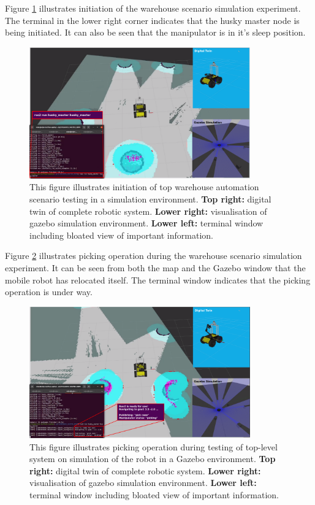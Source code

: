 Figure \ref{fig:R:WA:simTopLevel0} illustrates initiation of the warehouse scenario simulation experiment. The terminal in the lower right corner indicates that the husky master node is being initiated. It can also be seen that the manipulator is in it's sleep position.

\begin{figure}[htp!]
  \centering
  \includegraphics[width = 0.85\textwidth]{Figures/figSimTopLevel0.pdf}
  \caption{This figure illustrates initiation of top warehouse automation scenario testing in a simulation environment. \textbf{Top right:} digital twin of complete robotic system. \textbf{Lower right:} visualisation of gazebo simulation environment. \textbf{Lower left:} terminal window including bloated view of important information.}
  \label{fig:R:WA:simTopLevel0}
\end{figure}

Figure \ref{fig:R:WA:simTopLevel1} illustrates picking operation during the warehouse scenario simulation experiment. It can be seen from both the map and the Gazebo window that the mobile robot has relocated itself. The terminal window indicates that the picking operation is under way.

\begin{figure}[htp!]
  \centering
  \includegraphics[width = 0.85\textwidth]{Figures/figSimTopLevel1.pdf}
  \caption{This figure illustrates picking operation during testing of top-level system on simulation of the robot in a Gazebo environment. \textbf{Top right:} digital twin of complete robotic system. \textbf{Lower right:} visualisation of gazebo simulation environment. \textbf{Lower left:} terminal window including bloated view of important information.}
  \label{fig:R:WA:simTopLevel1}
\end{figure}

